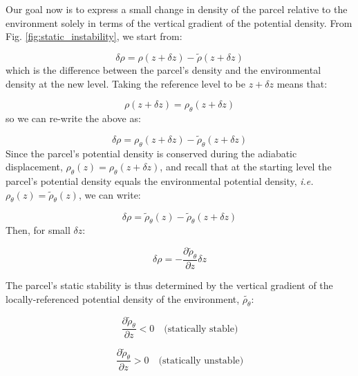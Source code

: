 \documentclass[12pt]{article}
\numberwithin{equation}{section}
\numberwithin{figure}{section}
\numberwithin{table}{section}
\begin{document}
Our goal now is to express a small change in density of the parcel relative to
the environment solely in terms of the vertical gradient of the potential density.
From Fig. \ref{fig:static_instability}, we start from:

\begin{equation}
  \delta \rho = \rho(z + \delta z) - \widetilde{\rho}(z + \delta z)
\end{equation}
which is the difference between the parcel's density and the environmental
density at the new level.
Taking the reference level to be  $z + \delta z$ means that:

\begin{equation}
  \rho(z + \delta z) = \rho_\theta(z + \delta z)
\end{equation}
so we can re-write the above as:

\begin{equation}
  \delta \rho = \rho_\theta(z + \delta z) - \widetilde{\rho}_\theta(z + \delta z)
\end{equation}
Since the parcel's potential density is conserved during the adiabatic
displacement, $\rho_\theta(z) = \rho_\theta(z+\delta z)$, and recall that at
the starting level the parcel's potential density equals the environmental
potential density, \textit{i.e.} $\rho_\theta(z) = \widetilde{\rho}_\theta(z)$,
we can write:

\begin{equation}
  \delta \rho = \widetilde{\rho}_\theta(z) - \widetilde{\rho}_\theta(z + \delta z)
\end{equation}
Then, for small $\delta z$:

\begin{equation}
  \delta \rho = - \frac{\partial \widetilde{\rho}_\theta}{\partial z} \delta z
\end{equation}

The parcel's static stability is thus determined by the vertical gradient of
the locally-referenced potential density of the environment,
$\widetilde{\rho_\theta}$:

\begin{equation}
  \frac{\partial \widetilde{\rho}_\theta}{\partial z} < 0 \quad \text{(statically stable)}
\end{equation}

\begin{equation}
  \frac{\partial \widetilde{\rho}_\theta}{\partial z} > 0 \quad \text{(statically unstable)}
\end{equation}
\end{document}
